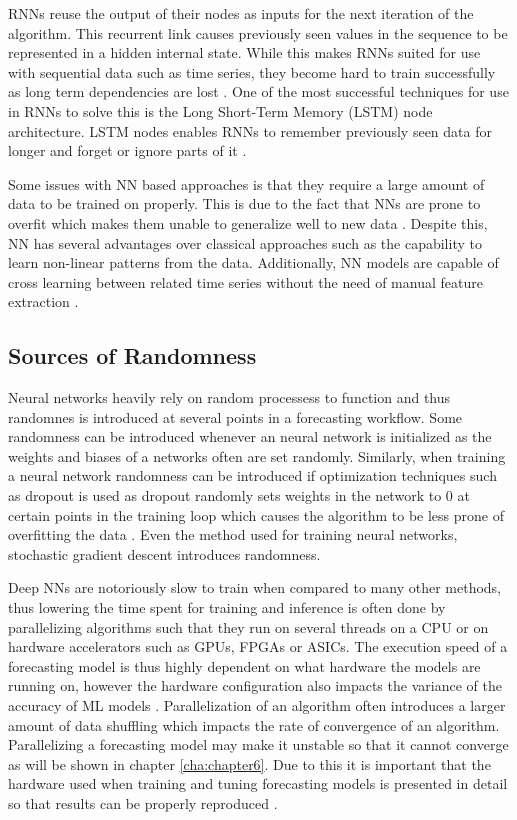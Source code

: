 RNNs reuse the output of their nodes as inputs for the next iteration of the algorithm. This recurrent link causes previously seen values in the sequence to be represented in a hidden internal state. While this makes RNNs suited for use with sequential data such as time series, they become hard to train successfully as long term dependencies are lost \cite{bengio1994learning}. One of the most successful techniques for use in RNNs to solve this is the Long Short-Term Memory (LSTM) node architecture. LSTM nodes enables RNNs to remember previously seen data for longer and forget or ignore parts of it \cite{sherstinsky_fundamentals_2020}.

Some issues with NN based approaches is that they require a large amount of data to be trained on properly. This is due to the fact that NNs are prone to overfit which makes them unable to generalize well to new data \cite{srivastava_dropout_2014}. Despite this, NN has several advantages over classical approaches such as the capability to learn non-linear patterns from the data. Additionally, NN models are capable of cross learning between related time series without the need of manual feature extraction \cite{smyl_hybrid_2020}.

\subsection{Sources of Randomness}
\label{subsec:sources_randomness}
Neural networks heavily rely on random processess to function and thus randomnes is introduced at several points in a forecasting workflow. Some randomness can be introduced whenever an neural network is initialized as the weights and biases of a networks often are set randomly. Similarly, when training a neural network randomness can be introduced if optimization techniques such as dropout is used as dropout randomly sets weights in the network to 0 at certain points in the training loop which causes the algorithm to be less prone of overfitting the data \cite{srivastava_dropout_2014}. Even the method used for training neural networks, stochastic gradient descent introduces randomness.

Deep NNs are notoriously slow to train when compared to many other methods, thus lowering the time spent for training and inference is often done by parallelizing algorithms such that they run on several threads on a CPU or on hardware accelerators such as GPUs, FPGAs or ASICs. The execution speed of a forecasting model is thus highly dependent on what hardware the models are running on, however the hardware configuration also impacts the variance of the accuracy of ML models \cite{zhuang2021randomness}. Parallelization of an algorithm often introduces a larger amount of data shuffling which impacts the rate of convergence of an algorithm. Parallelizing a forecasting model may make it unstable so that it cannot converge as will be shown in chapter \ref{cha:chapter6}. Due to this it is important that the hardware used when training and tuning forecasting models is presented in detail so that results can be properly reproduced \cite{pineau2020improving}.

